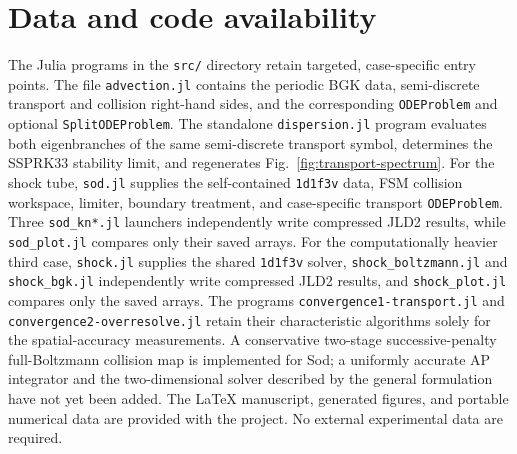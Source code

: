 \documentclass[preprint,3p,12pt]{elsarticle}
\begin{document}
\section*{Data and code availability}

The Julia programs in the \texttt{src/} directory retain targeted, case-specific entry points. The file \texttt{advection.jl} contains the periodic BGK data, semi-discrete transport and collision right-hand sides, and the corresponding \texttt{ODEProblem} and optional \texttt{SplitODEProblem}. The standalone \texttt{dispersion.jl} program evaluates both eigenbranches of the same semi-discrete transport symbol, determines the SSPRK33 stability limit, and regenerates Fig.~\ref{fig:transport-spectrum}. For the shock tube, \texttt{sod.jl} supplies the self-contained \texttt{1d1f3v} data, FSM collision workspace, limiter, boundary treatment, and case-specific transport \texttt{ODEProblem}. Three \texttt{sod\_kn*.jl} launchers independently write compressed JLD2 results, while \texttt{sod\_plot.jl} compares only their saved arrays. For the computationally heavier third case, \texttt{shock.jl} supplies the shared \texttt{1d1f3v} solver, \texttt{shock\_boltzmann.jl} and \texttt{shock\_bgk.jl} independently write compressed JLD2 results, and \texttt{shock\_plot.jl} compares only the saved arrays. The programs \texttt{convergence1-transport.jl} and \texttt{convergence2-overresolve.jl} retain their characteristic algorithms solely for the spatial-accuracy measurements. A conservative two-stage successive-penalty full-Boltzmann collision map is implemented for Sod; a uniformly accurate AP integrator and the two-dimensional solver described by the general formulation have not yet been added. The LaTeX manuscript, generated figures, and portable numerical data are provided with the project. No external experimental data are required.



\end{document}
